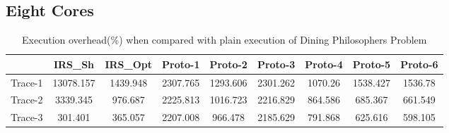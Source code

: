 \newpage
\subsection{Eight Cores}
\begin{table}[h]
\begin{center}
 \begin{tabular}{|c c c c c c c c c|} 
 \hline
 & IRS\_Sh & IRS\_Opt& Proto-1 & Proto-2 & Proto-3 & Proto-4 & Proto-5 & Proto-6\\ %
 \hline
Trace-1 & 13078.157 & 1439.948 & 2307.765 & 1293.606 & 2301.262 & 1070.26 & 1538.427 & 1536.78\\
Trace-2 & 3339.345 & 976.687 & 2225.813 & 1016.723 & 2216.829 & 864.586 & 685.367 & 661.549\\
Trace-3 & 301.401 & 365.057 & 2207.008 & 966.478 & 2185.629 & 791.868 & 625.616 & 598.105\\
\hline
\end{tabular}
\end{center}
\caption{Execution overhead(\%) when compared with plain execution of Dining Philosophers Problem}
\label{dining_phil_irs_res_cores_8}
\end{table}
